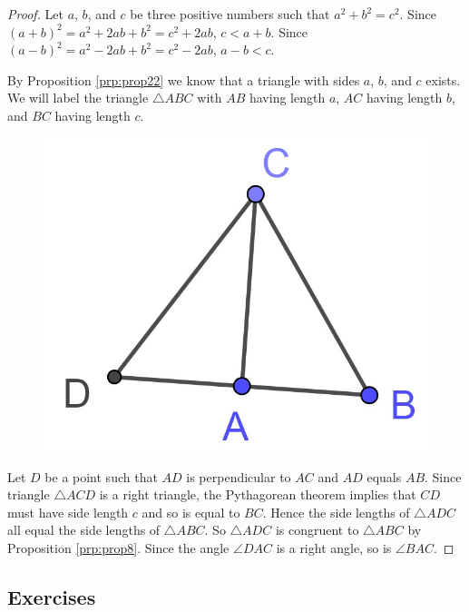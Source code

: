 \documentclass[
]{book}
\theoremstyle{definition}
\theoremstyle{definition}
\theoremstyle{definition}
\theoremstyle{definition}
\theoremstyle{remark}
\begin{document}
\begin{proof}

Let \(a\), \(b\), and \(c\) be three positive numbers such that \(a^2+b^2=c^2\). Since \((a+b)^2 = a^2+2ab+b^2 = c^2 + 2ab\), \(c<a+b\). Since \((a-b)^2 = a^2-2ab+b^2 = c^2-2ab\), \(a-b<c\).

By Proposition \ref{prp:prop22} we know that a triangle with sides \(a\), \(b\), and \(c\) exists. We will label the triangle \(\triangle ABC\) with \(AB\) having length \(a\), \(AC\) having length \(b\), and \(BC\) having length \(c\).

\begin{figure}

{\centering \includegraphics[width=0.2\linewidth]{images/pythagorean2} 

}

\end{figure}

Let \(D\) be a point such that \(AD\) is perpendicular to \(AC\) and \(AD\) equals \(AB\). Since triangle \(\triangle ACD\) is a right triangle, the Pythagorean theorem implies that \(CD\) must have side length \(c\) and so is equal to \(BC\). Hence the side lengths of \(\triangle ADC\) all equal the side lengths of \(\triangle ABC\). So \(\triangle ADC\) is congruent to \(\triangle ABC\) by Proposition \ref{prp:prop8}. Since the angle \(\angle DAC\) is a right angle, so is \(\angle BAC\).

\end{proof}

\hypertarget{exercises-45}{%
\subsection{Exercises}\label{exercises-45}}
\end{document}
